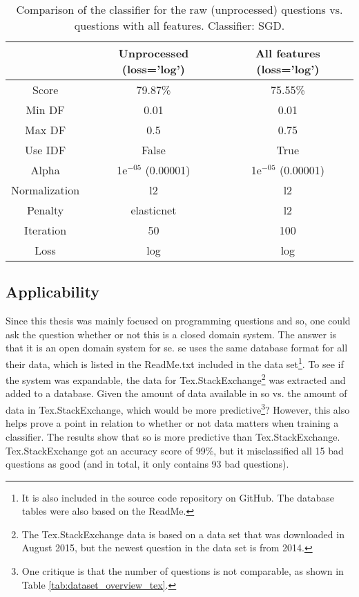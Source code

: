 \begin{table}[!h]%
	\centering
	\begin{tabular}{| c | c | c |}
		\hline
		~				& Unprocessed (loss='log')	& All features (loss='log')	\\ \hline
		Score 			& 79.87\%					& 75.55\%					\\ \hline
		Min DF 			& 0.01						& 0.01						\\ \hline
		Max DF 			& 0.5						& 0.75						\\ \hline
		Use IDF			& False						& True						\\ \hline
		Alpha 			& 1e$^{-05}$ (0.00001)		& 1e$^{-05}$ (0.00001)		\\ \hline
		Normalization 	& l2						& l2						\\ \hline		
		Penalty 		& elasticnet				& l2						\\ \hline
		Iteration 		& 50						& 100						\\ \hline
		Loss 			& log						& log						\\ \hline		
	\end{tabular}
	\caption{Comparison of the classifier for the raw (unprocessed) questions vs. questions with all features. Classifier: SGD.}
	\label{tab:unprocessed_vs_all_feature_detectors_sgd_so}
\end{table}




\subsection{Applicability}
\label{sec:applicability}
Since this thesis was mainly focused on programming questions and \gls{so}, one could ask the question whether or not this is a closed domain system. 
The answer is that it is an open domain system for \gls{se}.
\gls{se} uses the same database format for all their data, which is listed in the ReadMe.txt included in the data set\footnote{
	It is also included in the source code repository on GitHub.
	The database tables were also based on the ReadMe.
}.
\vspace{0.5em}\newline
To see if the system was expandable, the data for Tex.StackExchange\footnote{
	The Tex.StackExchange data is based on a data set that was downloaded in August 2015, but the newest question in the data set is from 2014.
} was extracted and added to a database. 
Given the amount of data available in \gls{so} vs. the amount of data in Tex.StackExchange, which would be more predictive\footnote{
	One critique is that the number of questions is not comparable, as shown in Table \ref{tab:dataset_overview_tex}.
}?
However, this also helps prove a point in relation to whether or not data matters when training a classifier.
The results show that \gls{so} is more predictive than Tex.StackExchange.
Tex.StackExchange got an accuracy score of 99\%, but it misclassified all 15 bad questions as good (and in total, it only contains 93 bad questions).


